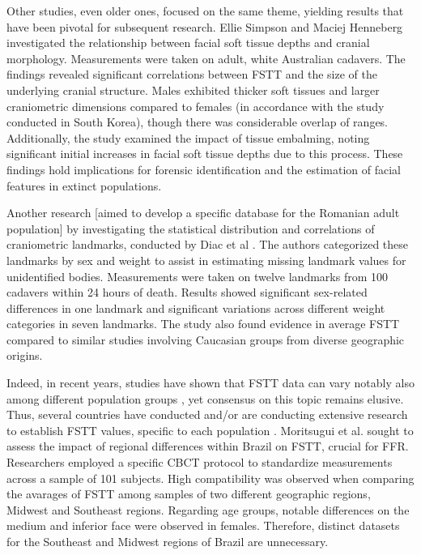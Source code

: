 \documentclass[journal,article,submit,pdftex,moreauthors]{Definitions/mdpi}
\begin{document}
Other studies, even older ones, focused on the same theme, yielding results that have been pivotal for subsequent research. Ellie Simpson and Maciej Henneberg \cite{ref20} investigated the relationship between facial soft tissue depths and cranial morphology. Measurements were taken on adult, white Australian cadavers. The findings revealed significant correlations between FSTT and the size of the underlying cranial structure. Males exhibited thicker soft tissues and larger craniometric dimensions compared to females (in accordance with the study conducted in South Korea), though there was considerable overlap of ranges. Additionally, the study examined the impact of tissue embalming, noting significant initial increases in facial soft tissue depths due to this process. These findings hold implications for forensic identification and the estimation of facial features in extinct populations.

Another research [aimed to develop a specific database for the Romanian adult population] by investigating the statistical distribution and correlations of craniometric landmarks, conducted by Diac et al \cite{ref21}. The authors categorized these landmarks by sex and weight to assist in estimating missing landmark values for unidentified bodies. Measurements were taken on twelve landmarks from 100 cadavers within 24 hours of death. Results showed significant sex-related differences in one landmark and significant variations across different weight categories in seven landmarks. The study also found evidence in average FSTT compared to similar studies involving Caucasian groups from diverse geographic origins.

Indeed, in recent years, studies have shown that FSTT data can vary notably also among different population groups \citep{ref13,ref22,ref23,ref24,ref25}, yet consensus on this topic remains elusive. Thus, several countries 
have conducted and/or are conducting extensive research to establish FSTT values, specific to each population \citep{ref13,ref14,ref15,ref16,ref17,ref18}. Moritsugui et al. \cite{ref26} sought to assess the impact of regional differences within Brazil on FSTT, crucial for FFR. Researchers employed a specific CBCT protocol to standardize measurements across a sample of 101 subjects. High compatibility was observed when comparing the avarages of FSTT among samples of two different geographic regions, Midwest and Southeast regions. Regarding age groups, notable differences on the medium and inferior face were observed in females. Therefore, distinct datasets for the Southeast and Midwest regions of Brazil are unnecessary.
\end{document}

